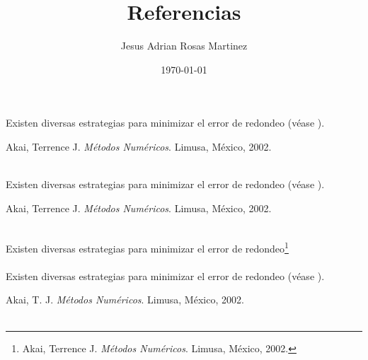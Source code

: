\documentclass[12pt]{article}
\title{Referencias}
\author{Jesus Adrian Rosas Martinez}
\date{\small{\today}}
\begin{document}
\maketitle %


Existen diversas estrategias para minimizar el error de redondeo (véase \cite{Ling1}).
\begin{thebibliography}{XXX99}
Akai, Terrence J. \emph{Métodos Numéricos}. Limusa, México, 2002.\\\\
\end{thebibliography}


Existen diversas estrategias para minimizar el error de redondeo (véase \cite{Ling2}).
\begin{thebibliography}{XXX99}
Akai, Terrence J. \emph{Métodos Numéricos}. Limusa, México, 2002.\\\\
\end{thebibliography}


Existen diversas estrategias para minimizar el error de redondeo\footnote{Akai, Terrence J. \emph{Métodos Numéricos}. Limusa, México, 2002.}\\\\


Existen diversas estrategias para minimizar el error de redondeo (véase \cite{Ling1}).
\begin{thebibliography}{99}
Akai, T. J. \emph{Métodos Numéricos}. Limusa, México, 2002.\\\\
\end{thebibliography}
\end{document}
